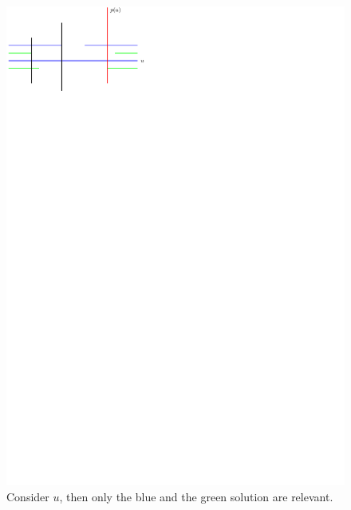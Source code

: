 \documentclass[a4paper,english,numberwithinsect]{eurocg18}
\begin{document}
\begin{figure}[tbp]
	\centering
	\includegraphics{two_solutions_needed}
	\caption{Consider $ u $, then only the blue and the green solution are relevant.}
	\label{fig:two_solutions}
\end{figure}
\end{document}
